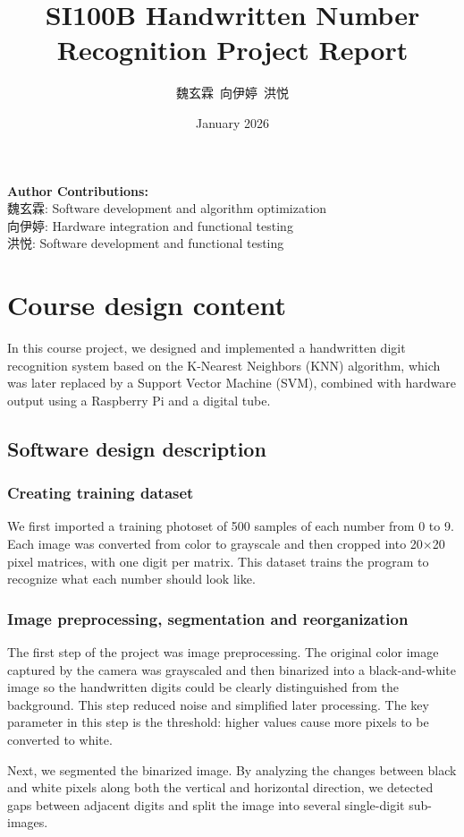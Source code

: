 \documentclass{article}
\title{SI100B Handwritten Number Recognition Project Report}
\author{魏玄霖~向伊婷~洪悦}
\date{January 2026}
\begin{document}
\maketitle
\noindent\textbf{Author Contributions:} \\
魏玄霖: Software development and algorithm optimization \\
向伊婷: Hardware integration and functional testing \\
洪悦: Software development and functional testing
\section{Course design content}
In this course project, we designed and implemented a handwritten digit recognition system based on the K-Nearest Neighbors (KNN) algorithm, which was later replaced by a Support Vector Machine (SVM), combined with hardware output using a Raspberry Pi and a digital tube.
\subsection{Software design description}
\subsubsection{Creating training dataset}
We first imported a training photoset of 500 samples of each number from 0 to 9. Each image was converted from color to grayscale and then cropped into 20×20 pixel matrices, with one digit per matrix. This dataset trains the program to recognize what each number should look like.
\subsubsection{Image preprocessing, segmentation and reorganization}
The first step of the project was image preprocessing. The original color image captured by the camera was grayscaled and then binarized into a black-and-white image so the handwritten digits could be clearly distinguished from the background. This step reduced noise and simplified later processing. The key parameter in this step is the threshold: higher values cause more pixels to be converted to white.

Next, we segmented the binarized image. By analyzing the changes between black and white pixels along both the vertical and horizontal direction, we detected gaps between adjacent digits and split the image into several single-digit sub-images.
\end{document}
